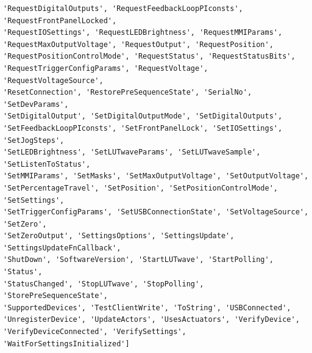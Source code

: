 \documentclass[12pt,a4paper]{article}
\begin{document}
\begin{verbatim}
'RequestDigitalOutputs', 'RequestFeedbackLoopPIconsts', 'RequestFrontPanelLocked', 
'RequestIOSettings', 'RequestLEDBrightness', 'RequestMMIParams', 
'RequestMaxOutputVoltage', 'RequestOutput', 'RequestPosition', 
'RequestPositionControlMode', 'RequestStatus', 'RequestStatusBits', 
'RequestTriggerConfigParams', 'RequestVoltage', 'RequestVoltageSource', 
'ResetConnection', 'RestorePreSequenceState', 'SerialNo', 'SetDevParams', 
'SetDigitalOutput', 'SetDigitalOutputMode', 'SetDigitalOutputs', 
'SetFeedbackLoopPIconsts', 'SetFrontPanelLock', 'SetIOSettings', 'SetJogSteps', 
'SetLEDBrightness', 'SetLUTwaveParams', 'SetLUTwaveSample', 'SetListenToStatus', 
'SetMMIParams', 'SetMasks', 'SetMaxOutputVoltage', 'SetOutputVoltage', 
'SetPercentageTravel', 'SetPosition', 'SetPositionControlMode', 'SetSettings', 
'SetTriggerConfigParams', 'SetUSBConnectionState', 'SetVoltageSource', 'SetZero', 
'SetZeroOutput', 'SettingsOptions', 'SettingsUpdate', 'SettingsUpdateFnCallback', 
'ShutDown', 'SoftwareVersion', 'StartLUTwave', 'StartPolling', 'Status', 
'StatusChanged', 'StopLUTwave', 'StopPolling', 'StorePreSequenceState', 
'SupportedDevices', 'TestClientWrite', 'ToString', 'USBConnected', 
'UnregisterDevice', 'UpdateActors', 'UsesActuators', 'VerifyDevice', 
'VerifyDeviceConnected', 'VerifySettings', 'WaitForSettingsInitialized']
\end{verbatim}
\end{document}
